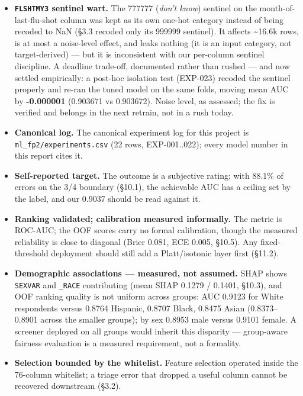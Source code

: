 \documentclass[11pt,a4paper]{article}
\providecommand{\tightlist}{\setlength{\itemsep}{2pt}\setlength{\parskip}{0pt}}
\begin{document}
{\begin{itemize}
\tightlist
\item
  \textbf{\texttt{FLSHTMY3} sentinel wart.} The 777777 (\emph{don't know}) sentinel on the month-of-last-flu-shot column was kept as its own one-hot category instead of being recoded to NaN (\S{}3.3 recoded only its 999999 sentinel). It affects \textasciitilde16.6k rows, is at most a noise-level effect, and leaks nothing (it is an input category, not target-derived) --- but it is inconsistent with our per-column sentinel discipline. A deadline trade-off, documented rather than rushed --- and now settled empirically: a post-hoc isolation test (EXP-023) recoded the sentinel properly and re-ran the tuned model on the same folds, moving mean AUC by \textbf{-0.000001} (0.903671 vs 0.903672). Noise level, as assessed; the fix is verified and belongs in the next retrain, not in a rush today.
\item
  \textbf{Canonical log.} The canonical experiment log for this project is \texttt{ml\_fp2/experiments.csv} (22 rows, EXP-001..022); every model number in this report cites it.
\item
  \textbf{Self-reported target.} The outcome is a subjective rating; with 88.1\% of errors on the 3/4 boundary (\S{}10.1), the achievable AUC has a ceiling set by the label, and our 0.9037 should be read against it.
\item
  \textbf{Ranking validated; calibration measured informally.} The metric is ROC-AUC; the OOF scores carry no formal calibration, though the measured reliability is close to diagonal (Brier 0.081, ECE 0.005, \S{}10.5). Any fixed-threshold deployment should still add a Platt/isotonic layer first (\S{}11.2).
\item
  \textbf{Demographic associations --- measured, not assumed.} SHAP shows \texttt{SEXVAR} and \texttt{\_RACE} contributing (mean \textbar SHAP\textbar{} 0.1279 / 0.1401, \S{}10.3), and OOF ranking quality is not uniform across groups: AUC 0.9123 for White respondents versus 0.8764 Hispanic, 0.8707 Black, 0.8475 Asian (0.8373--0.8901 across the smaller groups); by sex 0.8953 male versus 0.9101 female. A screener deployed on all groups would inherit this disparity --- group-aware fairness evaluation is a measured requirement, not a formality.
\item
  \textbf{Selection bounded by the whitelist.} Feature selection operated inside the 76-column whitelist; a triage error that dropped a useful column cannot be recovered downstream (\S{}3.2).
\end{itemize}

}
\end{document}
